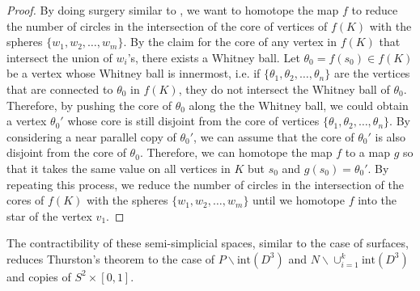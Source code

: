 \documentclass[a4paper]{amsart}
\theoremstyle{definition}
\theoremstyle{remark}
\numberwithin{equation}{section}
\begin{document}
\begin{proof}
By doing surgery similar to , we want to homotope the map $f$ to reduce the number of circles in the intersection of the core of vertices of $f(K)$ with the spheres $\{w_1, w_2, \dots, w_m\}$. By the claim for the core of any vertex in $f(K)$ that intersect the union of $w_i$'s, there exists a Whitney ball.  Let $\theta_0=f(s_0)\in f(K)$ be a vertex whose Whitney ball is innermost, i.e. if $\{\theta_1,\theta_2,\dots,\theta_n\}$ are the vertices that are connected to $\theta_0$ in $f(K)$, they do not intersect the Whitney ball of $\theta_0$. Therefore, by pushing the core of $\theta_0$ along the the Whitney ball, we could obtain a vertex $\theta_0'$ whose core is still disjoint from the core of vertices $\{\theta_1,\theta_2,\dots,\theta_n\}$. By considering a  near parallel copy of $\theta_0'$, we can assume that the core of $\theta_0'$ is also disjoint from the core of $\theta_0$. Therefore, we can homotope the map $f$ to a map $g$ so that it takes the same value on all vertices in $K$ but $s_0$ and $g(s_0)=\theta_0'$. By repeating this process, we reduce the number of circles in the intersection of the cores of $f(K)$ with the spheres $\{w_1, w_2, \dots, w_m\}$ until we homotope $f$ into the star of the vertex $v_1$. 
\end{proof}
The contractibility of these semi-simplicial spaces, similar to the case of surfaces, reduces Thurston's theorem to the case of $P\backslash \text{int}(D^3)$  and $N\backslash \cup_{i=1}^{k}\text{int}(D^3)$ and copies of $S^2\times [0,1]$.
\end{document}
